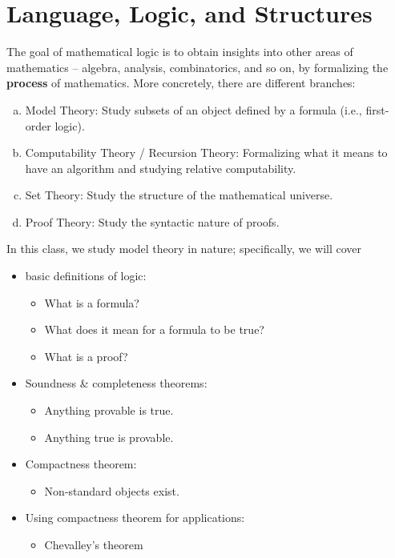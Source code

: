 \chapter{Language, Logic, and Structures}
The goal of mathematical logic is to obtain insights into other areas of mathematics -- algebra, analysis, combinatorics, and so on, by formalizing the \textbf{process} of mathematics. More concretely, there are different branches:
\begin{enumerate}[(a)]
	\item Model Theory: Study subsets of an object defined by a formula (i.e., first-order logic).
	\item Computability Theory / Recursion Theory: Formalizing what it means to have an algorithm and studying relative computability.
	\item Set Theory: Study the structure of the mathematical universe.
	\item Proof Theory: Study the syntactic nature of proofs.
\end{enumerate}

In this class, we study model theory in nature; specifically, we will cover
\begin{itemize}
	\item basic definitions of logic:
	      \begin{itemize}
		      \item What is a formula?
		      \item What does it mean for a formula to be true?
		      \item What is a proof?
	      \end{itemize}
	\item Soundness \& completeness theorems:
	      \begin{itemize}
		      \item Anything provable is true.
		      \item Anything true is provable.
	      \end{itemize}
	\item Compactness theorem:
	      \begin{itemize}
		      \item Non-standard objects exist.
	      \end{itemize}
	\item Using compactness theorem for applications:
	      \begin{itemize}
		      \item Chevalley's theorem
	      \end{itemize}
\end{itemize}

